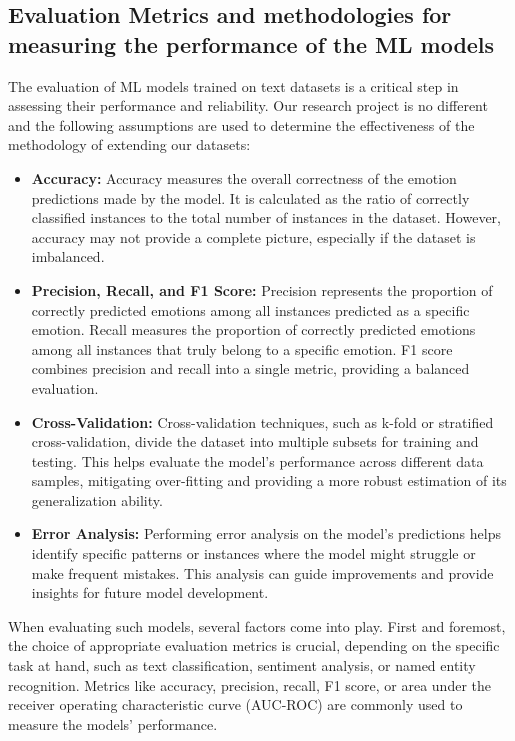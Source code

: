 \documentclass[11pt]{article}
\begin{document}
\subsection{Evaluation Metrics and methodologies for measuring the performance of the ML models}
The evaluation of ML models trained on text datasets is a critical step in assessing their performance and reliability. Our research project is no different and the following assumptions are used to determine the effectiveness of the methodology of extending our datasets:
\begin{itemize}
\item \textbf{Accuracy:} Accuracy measures the overall correctness of the emotion predictions made by the model. It is calculated as the ratio of correctly classified instances to the total number of instances in the dataset. However, accuracy may not provide a complete picture, especially if the dataset is imbalanced.
\item \textbf{Precision, Recall, and F1 Score:} Precision represents the proportion of correctly predicted emotions among all instances predicted as a specific emotion. Recall measures the proportion of correctly predicted emotions among all instances that truly belong to a specific emotion. F1 score combines precision and recall into a single metric, providing a balanced evaluation.
\item \textbf{Cross-Validation:} Cross-validation techniques, such as k-fold or stratified cross-validation, divide the dataset into multiple subsets for training and testing. This helps evaluate the model's performance across different data samples, mitigating over-fitting and providing a more robust estimation of its generalization ability.
\item \textbf{Error Analysis:} Performing error analysis on the model's predictions helps identify specific patterns or instances where the model might struggle or make frequent mistakes. This analysis can guide improvements and provide insights for future model development.
\end{itemize}

When evaluating such models, several factors come into play. First and foremost, the choice of appropriate evaluation metrics is crucial, depending on the specific task at hand, such as text classification, sentiment analysis, or named entity recognition. Metrics like accuracy, precision, recall, F1 score, or area under the receiver operating characteristic curve (AUC-ROC) are commonly used to measure the models' performance.
\end{document}
